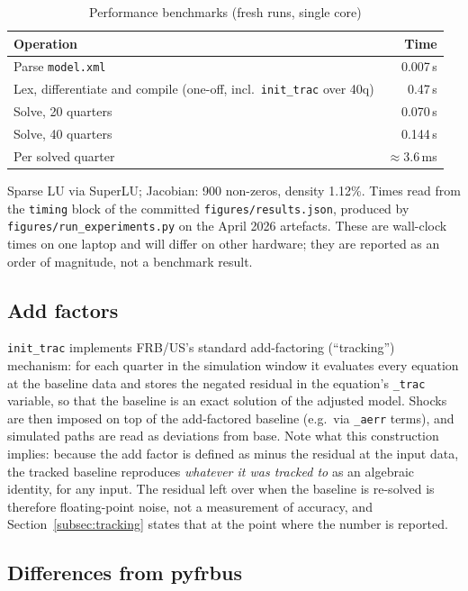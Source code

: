 \begin{table}[htbp]
\centering
\caption{Performance benchmarks (fresh runs, single core)}
\label{tab:perf}
\begin{tabular}{lr}
\toprule
Operation & Time \\
\midrule
Parse \texttt{model.xml} & 0.007\,s \\
Lex, differentiate and compile (one-off, incl.\ \texttt{init\_trac} over 40q) & 0.47\,s \\
Solve, 20 quarters & 0.070\,s \\
Solve, 40 quarters & 0.144\,s \\
Per solved quarter & $\approx$3.6\,ms \\
\bottomrule
\end{tabular}

\medskip
\parbox{0.8\textwidth}{\footnotesize Sparse LU via SuperLU; Jacobian: 900 non-zeros, density 1.12\%. Times read from the \texttt{timing} block of the committed \texttt{figures/results.json}, produced by \texttt{figures/run\_experiments.py} on the April 2026 artefacts. These are wall-clock times on one laptop and will differ on other hardware; they are reported as an order of magnitude, not a benchmark result.}
\end{table}

\subsection{Add factors}

\texttt{init\_trac} implements FRB/US's standard add-factoring (``tracking'') mechanism: for each quarter in the simulation window it evaluates every equation at the baseline data and stores the negated residual in the equation's \texttt{\_trac} variable, so that the baseline is an exact solution of the adjusted model. Shocks are then imposed on top of the add-factored baseline (e.g.\ via \texttt{\_aerr} terms), and simulated paths are read as deviations from base. Note what this construction implies: because the add factor is defined as minus the residual at the input data, the tracked baseline reproduces \emph{whatever it was tracked to} as an algebraic identity, for any input. The residual left over when the baseline is re-solved is therefore floating-point noise, not a measurement of accuracy, and Section~\ref{subsec:tracking} states that at the point where the number is reported.

\subsection{Differences from pyfrbus}

